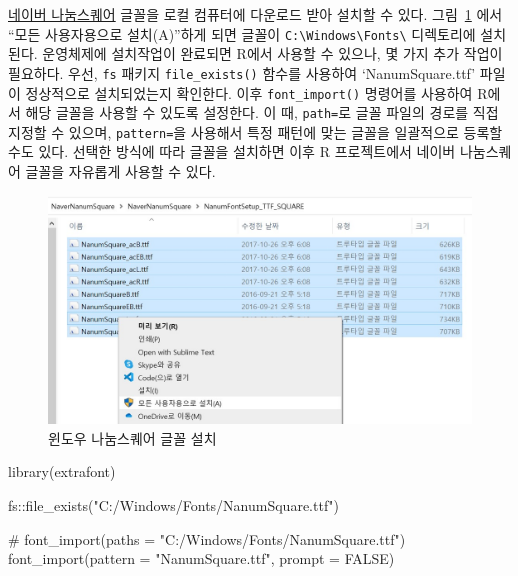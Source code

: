 \documentclass[
  letterpaper,
]{book}
\newenvironment{Shaded}{\begin{snugshade}}{\end{snugshade}}
\newcommand{\AttributeTok}[1]{\textcolor[rgb]{0.40,0.45,0.13}{#1}}
\newcommand{\CommentTok}[1]{\textcolor[rgb]{0.37,0.37,0.37}{#1}}
\newcommand{\ConstantTok}[1]{\textcolor[rgb]{0.56,0.35,0.01}{#1}}
\newcommand{\FunctionTok}[1]{\textcolor[rgb]{0.28,0.35,0.67}{#1}}
\newcommand{\NormalTok}[1]{\textcolor[rgb]{0.00,0.23,0.31}{#1}}
\newcommand{\SpecialCharTok}[1]{\textcolor[rgb]{0.37,0.37,0.37}{#1}}
\newcommand{\StringTok}[1]{\textcolor[rgb]{0.13,0.47,0.30}{#1}}
\begin{document}
\href{https://campaign.naver.com/nanumsquare_neo}{네이버 나눔스퀘어}
글꼴을 로컬 컴퓨터에 다운로드 받아 설치할 수 있다.
그림~\ref{fig-nanumsquare} 에서 ``모든 사용자용으로 설치(A)''하게 되면
글꼴이
\texttt{C:\textbackslash{}Windows\textbackslash{}Fonts\textbackslash{}}
디렉토리에 설치된다. 운영체제에 설치작업이 완료되면 R에서 사용할 수
있으나, 몇 가지 추가 작업이 필요하다. 우선, \texttt{fs} 패키지
\texttt{file\_exists()} 함수를 사용하여 `NanumSquare.ttf' 파일이
정상적으로 설치되었는지 확인한다. 이후 \texttt{font\_import()} 명령어를
사용하여 R에서 해당 글꼴을 사용할 수 있도록 설정한다. 이 때,
\texttt{path=}로 글꼴 파일의 경로를 직접 지정할 수 있으며,
\texttt{pattern=}을 사용해서 특정 패턴에 맞는 글꼴을 일괄적으로 등록할
수도 있다. 선택한 방식에 따라 글꼴을 설치하면 이후 R 프로젝트에서 네이버
나눔스퀘어 글꼴을 자유롭게 사용할 수 있다.

\begin{figure}

{\centering \includegraphics{images/fonts_nanumsquare.jpg}

}

\caption{\label{fig-nanumsquare}윈도우 나눔스퀘어 글꼴 설치}

\end{figure}

\begin{Shaded}
\begin{Highlighting}[]
\FunctionTok{library}\NormalTok{(extrafont)}

\NormalTok{fs}\SpecialCharTok{::}\FunctionTok{file\_exists}\NormalTok{(}\StringTok{"C:/Windows/Fonts/NanumSquare.ttf"}\NormalTok{)}

\CommentTok{\# font\_import(paths = "C:/Windows/Fonts/NanumSquare.ttf")}
\FunctionTok{font\_import}\NormalTok{(}\AttributeTok{pattern =} \StringTok{"NanumSquare.ttf"}\NormalTok{, }\AttributeTok{prompt =} \ConstantTok{FALSE}\NormalTok{)}
\end{Highlighting}
\end{Shaded}
\end{document}
